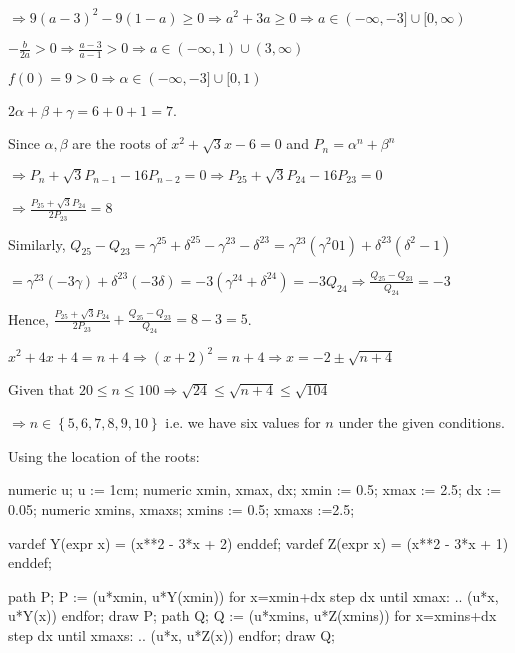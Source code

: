   $\Rightarrow 9(a - 3)^2 - 9(1 - a)\geq 0\Rightarrow a^2 + 3a\geq 0 \Rightarrow a\in(-\infty, -3]\cup
  [0, \infty)$

  $-\frac{b}{2a} > 0\Rightarrow \frac{a - 3}{a - 1} > 0\Rightarrow a\in(-\infty, 1)\cup (3, \infty)$

  $f(0) = 9 > 0\Rightarrow \alpha\in(-\infty, -3]\cup[0, 1)$

  $2\alpha + \beta + \gamma = 6 + 0 + 1 = 7$.
\item Since $\alpha, \beta$ are the roots of $x^2 + \sqrt{3}x - 6 = 0$ and $P_n = \alpha^n + \beta^n$

  $\Rightarrow P_n + \sqrt{3}P_{n - 1} - 16P_{n - 2} = 0\Rightarrow P_{25} + \sqrt{3}P_{24} - 16P_{23} = 0$

  $\Rightarrow \frac{P_{25} + \sqrt{3}P_{24}}{2P_{23}} = 8$

  Similarly, $Q_{25} - Q_{23} = \gamma^{25} + \delta^{25} - \gamma^{23} - \delta^{23}
  = \gamma^{23}\left(\gamma^2 0 1\right) + \delta^{23}\left(\delta^2 - 1\right)$

  $= \gamma^{23}(-3\gamma) + \delta^{23}(-3\delta) = -3\left(\gamma^{24} + \delta^{24}\right) =
  -3Q_{24}\Rightarrow \frac{Q_{25} - Q_{23}}{Q_{24}} = -3$

  Hence, $\frac{P_{25} + \sqrt{3}P_{24}}{2P_{23}} + \frac{Q_{25} - Q_{23}}{Q_{24}} = 8 - 3 = 5$.
\item $x^2 + 4x + 4 = n + 4\Rightarrow (x + 2)^2 = n + 4 \Rightarrow x = -2 \pm\sqrt{n + 4}$

  Given that $20\leq n\leq 100 \Rightarrow \sqrt{24}\leq \sqrt{n + 4}\leq \sqrt{104}$

  $\Rightarrow n\in\left\{5, 6, 7, 8, 9, 10\right\}$ i.e. we have six values for $n$ under the given
  conditions.
\item Using the location of the roots:

    \startplacefigure[location=force]
    \startMPcode
      numeric u; u := 1cm;     %
      numeric xmin, xmax, dx;
      xmin := 0.5; xmax := 2.5; dx := 0.05;
      numeric xmins, xmaxs;
      xmins := 0.5; xmaxs :=2.5;

      vardef Y(expr x) = (x**2 - 3*x + 2) enddef;
      vardef Z(expr x) = (x**2 - 3*x + 1) enddef;

      path P;
      P := (u*xmin, u*Y(xmin))
      for x=xmin+dx step dx until xmax:
      .. (u*x, u*Y(x))
      endfor;
      draw P;
      path Q;
      Q := (u*xmins, u*Z(xmins))
      for x=xmins+dx step dx until xmaxs:
      .. (u*x, u*Z(x))
      endfor;
      draw Q;

